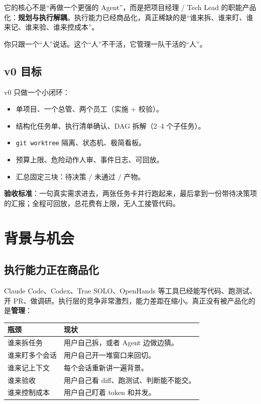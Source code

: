 \documentclass[UTF8,11pt,a4paper,fontset=windows]{ctexart}
\let\ocsection\section
\renewcommand{\section}{\Needspace{8\baselineskip}\ocsection}
\let\ocsubsection\subsection
\renewcommand{\subsection}{\Needspace{5\baselineskip}\ocsubsection}
\newcommand{\code}[1]{\texttt{#1}}
\begin{document}
它的核心不是“再做一个更强的 Agent”，而是把项目经理 / Tech Lead 的职能产品化：\textbf{规划与执行解耦}。执行能力已经商品化，真正稀缺的是“谁来拆、谁来盯、谁来记、谁来验、谁来控成本”。

\begin{keybox}[一句话记住这个产品]
你只跟一个“人”说话。这个“人”不干活，它管理一队干活的“人”。
\end{keybox}

\subsection*{v0 目标}
v0 只做一个小闭环：

\begin{itemize}
  \item 单项目、一个总管、两个员工（实施 + 校验）。
  \item 结构化任务单、执行清单确认、DAG 拆解（2--4 个子任务）。
  \item \code{git worktree} 隔离、状态机、极简看板。
  \item 预算上限、危险动作人审、事件日志、可回放。
  \item 汇总固定三块：待决策 / 未通过 / 产物。
\end{itemize}

\textbf{验收标准}：一句真实需求进去，两张任务卡并行跑起来，最后拿到一份带待决策项的汇报；全程可回放，总花费有上限，无人工接管代码。

\section{背景与机会}

\subsection{执行能力正在商品化}

Claude Code、Codex、Trae SOLO、OpenHands 等工具已经能写代码、跑测试、开 PR、做调研。执行层的竞争非常激烈，能力差距在缩小。真正没有被产品化的是\textbf{管理}：

\noindent\begin{minipage}{\linewidth}
\centering
{}
\small
\begin{tabularx}{\linewidth}{@{}p{4.2cm} X@{}}
\toprule
\textbf{瓶颈} & \textbf{现状} \\
\midrule
谁来拆任务 & 用户自己拆，或者 Agent 边做边猜。 \\
谁来盯多个会话 & 用户自己开一堆窗口来回切。 \\
谁来记上下文 & 每个会话重新讲一遍背景。 \\
谁来验收 & 用户自己看 diff、跑测试、判断能不能交。 \\
谁来控制成本 & 用户自己盯着 token 和并发。 \\
\bottomrule
\end{tabularx}
\end{minipage}
\end{document}
